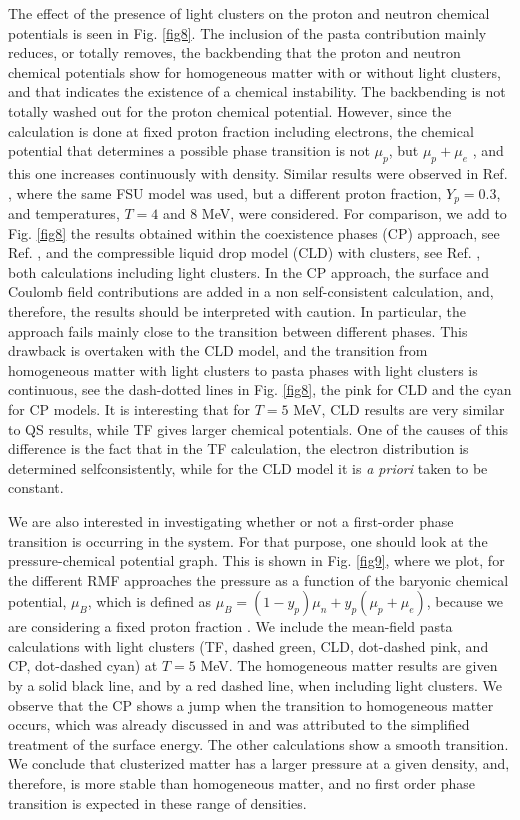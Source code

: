 \documentclass[aps,prc,nofootinbib,twocolumn,showpacs]{revtex4-1}
\begin{document}
The effect of the presence of light clusters on the proton and neutron
chemical potentials is seen in Fig. \ref{fig8}. 
The inclusion of the pasta
contribution mainly reduces, or totally removes, the backbending that
the proton and neutron chemical potentials show for homogeneous
matter with or without light clusters, and that indicates the existence of a chemical instability. The
backbending is not totally washed out for the proton chemical
potential. However, since the calculation is done at fixed proton
fraction including electrons,  the chemical potential
that determines a possible phase transition is not $\mu_p$, but
$\mu_p+\mu_e$ \cite{hempel09}, and this one increases continuously
with density. Similar results were observed in  Ref. \cite{PCP15}, where the same FSU model was used, but a different proton fraction, $Y_p=0.3$, and temperatures, $T=4$ and 8 MeV, were
considered.
For comparison, we add to Fig. \ref {fig8} the results
  obtained within the coexistence phases (CP) approach,
  see Ref.  \cite{PCP15}, and the compressible liquid drop model (CLD)
  with clusters, see Ref. \cite{pais2017}, both calculations including light clusters. In the CP approach, the
  surface and Coulomb field contributions are added in a
  non self-consistent calculation, and, therefore, the results should
  be interpreted with caution. In particular, the approach fails
  mainly close to the transition between different phases.  This drawback
  is overtaken with the CLD model, and the transition from homogeneous
  matter with light clusters to pasta phases with light clusters is
  continuous, see the dash-dotted lines  in
  Fig. \ref{fig8}, the pink  for CLD and the cyan 
  for CP models. It is interesting that for $T=5$ MeV, CLD results are
  very similar to QS results, while TF gives larger chemical
  potentials. One of the causes of this difference is the fact that
  in the TF calculation, the electron distribution is determined
  selfconsistently, while for the CLD model it is  {\it a
    priori} taken to be constant. 

 We are also interested in investigating whether or not a
  first-order phase transition is occurring in the system. For that
  purpose,  one should look at the pressure-chemical potential
  graph. This is shown in Fig. \ref{fig9}, where we plot, for the
  different RMF approaches the pressure as a function of the baryonic
  chemical potential, $\mu_B$, which is defined as
  $\mu_B=(1-y_p)\mu_n+y_p(\mu_p+\mu_e)$, because we are considering a
  fixed proton fraction \cite{hempel09}. We include the mean-field
  pasta calculations with light clusters (TF, dashed green, CLD,
  dot-dashed pink, and CP, dot-dashed cyan) at $T=5$ MeV. The
  homogeneous matter results are given by a solid black line, and by a red dashed line, when including light clusters. We
  observe that the CP shows a jump when the transition to homogeneous
  matter occurs, which was already discussed in \cite{PCP15} and was
  attributed to the simplified treatment of the surface energy. The
  other calculations show a smooth transition. We conclude that clusterized matter has a
larger pressure at a given density, and, therefore, is more stable
than homogeneous matter, and
no first order phase
transition is expected in these range of densities.
\end{document}
